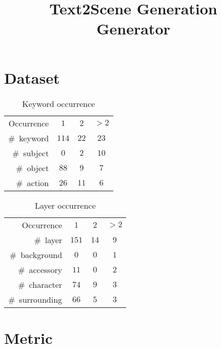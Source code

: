 \documentclass{article} %
\title{Text2Scene Generation \\ Generator}
\author{
}
\begin{document}
\maketitle

\begin{abstract}
\end{abstract}

\section{Dataset}

\begin{table}[htbp]
	\caption{Keyword occurrence}
	\centering
	\begin{tabular}{rccc}
		\toprule
		Occurrence & $1$ & $2$ & $>2$\\
		\#~keyword & $114$ & $22$ & $23$\\
		\midrule
		\#~subject & $0$ & $2$ & $10$\\
		\#~object & $88$ & $9$ & $7$\\
		\#~action & $26$ & $11$ & $6$\\
		\bottomrule
	\end{tabular}%
	\label{tab: feat}
\end{table}

\begin{table}[htbp]
	\caption{Layer occurrence}
	\centering
	\begin{tabular}{rccc}
		\toprule
		Occurrence & $1$ & $2$ & $>2$\\
		\#~layer & $151$ & $14$ & $9$\\
		\midrule
		\#~background & $0$ & $0$ & $1$\\
		\#~accessory & $11$ & $0$ & $2$\\
		\#~character & $74$ & $9$ & $3$\\
		\#~surrounding & $66$ & $5$ & $3$\\
		
		\bottomrule
	\end{tabular}%
	\label{tab: feat}
\end{table}

\section{Metric}
\end{document}
